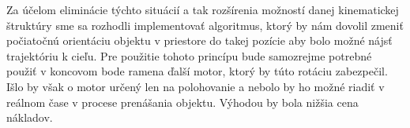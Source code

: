Za účelom eliminácie týchto situácií a tak rozšírenia možností danej kinematickej štruktúry sme sa rozhodli implementovať algoritmus, ktorý by nám dovolil zmeniť počiatočnú orientáciu objektu v priestore do takej pozície aby bolo možné nájsť trajektóriu k cieľu. Pre použitie tohoto princípu bude samozrejme potrebné použiť v koncovom bode ramena ďalší motor, ktorý by túto rotáciu zabezpečil. Išlo by však o motor určený len na polohovanie a nebolo by ho možné riadiť v reálnom čase v procese prenášania objektu. Výhodou by bola nižšia cena nákladov.





